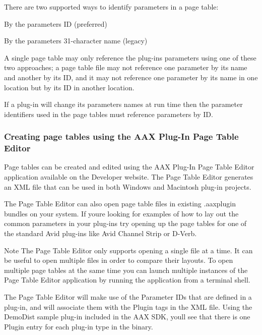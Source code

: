 There are two supported ways to identify parameters in a page table\+:
\begin{DoxyItemize}
\item By the parameter\textquotesingle{}s ID (preferred)
\item By the parameter\textquotesingle{}s 31-\/character name (legacy)
\end{DoxyItemize}

A single page table may only reference the plug-\/in\textquotesingle{}s parameters using one of these two approaches; a page table file may not reference one parameter by its name and another by its ID, and it may not reference one parameter by its name in one location but by its ID in another location.

If a plug-\/in will change its parameters\textquotesingle{} names at run time then the parameter identifiers used in the page tables must reference parameters by ID.

\hypertarget{a00833_subsection_creating_page_tables_in_pete}{}\subsubsection{Creating page tables using the A\+A\+X Plug-\/\+In Page Table Editor}\label{a00833_subsection_creating_page_tables_in_pete}
 Page tables can be created and edited using the A\+AX Plug-\/\+In Page Table Editor application available on the Developer website. The Page Table Editor generates an X\+ML file that can be used in both Windows and Macintosh plug-\/in projects.

The Page Table Editor can also open page table files in existing .aaxplugin bundles on your system. If you\textquotesingle{}re looking for examples of how to lay out the common parameters in your plug-\/ins try opening up the page tables for one of the standard Avid plug-\/ins like Avid Channel Strip or D-\/\+Verb.

\begin{DoxyNote}{Note}
The Page Table Editor only supports opening a single file at a time. It can be useful to open multiple files in order to compare their layouts. To open multiple page tables at the same time you can launch multiple instances of the Page Table Editor application by running the application from a terminal shell.
\end{DoxyNote}
The Page Table Editor will make use of the Parameter I\+Ds that are defined in a plug-\/in, and will associate them with the \textquotesingle{}Plugin\textquotesingle{} tags in the X\+ML file. Using the Demo\+Dist sample plug-\/in included in the A\+AX S\+DK, you\textquotesingle{}ll see that there is one Plugin entry for each plug-\/in type in the binary.


